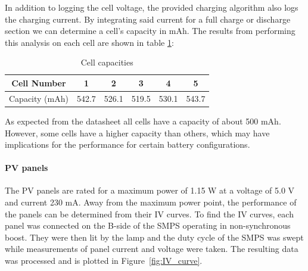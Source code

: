 \documentclass[a4paper]{article}
\begin{document}
In addition to logging the cell voltage, the provided charging algorithm also 
logs the charging current. By integrating said current for a full charge or 
discharge section we can determine a cell's capacity in mAh. The results from 
performing this analysis on each cell are shown in table \ref{table:1}:

\vspace{5pt}
\begin{table}[h!]
    \centering
    \begin{tabular}{||c| c c c c c||} 
        \hline
        Cell Number& 1 & 2 & 3 & 4 & 5 \\ [0.5ex] 
        \hline
        Capacity (mAh) & 542.7	& 526.1	& 519.5	& 530.1	& 543.7\\ [1ex] 
        \hline
    \end{tabular}
    \caption{Cell capacities}
    \label{table:1}
\end{table}

As expected from the datasheet\cite{batteryDatasheet} all cells have a capacity of about 500 mAh. However, some cells 
have a higher capacity than others, which may have implications for the 
performance for certain battery configurations.

\paragraph*{PV panels}
The PV panels are rated for a maximum power of 1.15 W at a voltage of 
5.0 V and current 230 mA. Away from the maximum power point, the performance 
of the panels can be determined from their IV curves. To find the IV 
curves, each panel was connected on the B-side of the SMPS operating 
in non-synchronous boost. They were then lit by the lamp and the duty 
cycle of the SMPS was swept while measurements of panel current and 
voltage were taken. The resulting data was processed and is plotted 
in Figure~\ref{fig:IV_curve}.
\end{document}
